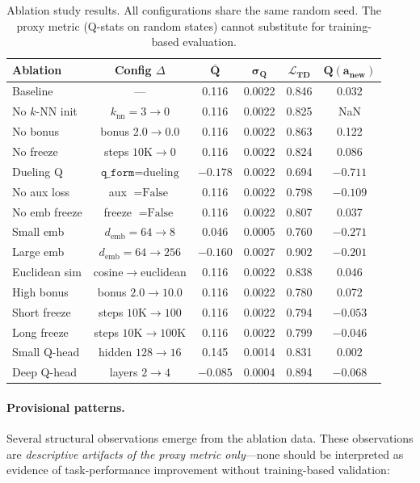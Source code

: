 \documentclass{article}
\begin{document}
\begin{table}[h]
  \centering
  \caption{Ablation study results. All configurations share the same random seed. The proxy metric (Q-stats on random states) cannot substitute for training-based evaluation.}
  \label{tab:ablations}
  \small
  \begin{tabular}{lccccc}
    \toprule
    \textbf{Ablation} & \textbf{Config $\Delta$} & $\mathbf{\bar{Q}}$ & $\mathbf{\sigma_Q}$ & $\mathbf{\mathcal{L}_\text{TD}}$ & $\mathbf{Q(a_\text{new})}$ \\
    \midrule
    Baseline & --- & 0.116 & 0.0022 & 0.846 & 0.032 \\
    No $k$-NN init & $k_\text{nn}=3 \to 0$ & 0.116 & 0.0022 & 0.825 & NaN \\
    No bonus & bonus $2.0 \to 0.0$ & 0.116 & 0.0022 & 0.863 & 0.122 \\
    No freeze & steps $10\text{K} \to 0$ & 0.116 & 0.0022 & 0.824 & 0.086 \\
    Dueling Q & $\texttt{q\_form}=\text{dueling}$ & $-0.178$ & 0.0022 & 0.694 & $-0.711$ \\
    No aux loss & aux $=\text{False}$ & 0.116 & 0.0022 & 0.798 & $-0.109$ \\
    No emb freeze & freeze $=\text{False}$ & 0.116 & 0.0022 & 0.807 & 0.037 \\
    Small emb & $d_\text{emb}=64\to 8$ & 0.046 & 0.0005 & 0.760 & $-0.271$ \\
    Large emb & $d_\text{emb}=64\to 256$ & $-0.160$ & 0.0027 & 0.902 & $-0.201$ \\
    Euclidean sim & cosine$\to$euclidean & 0.116 & 0.0022 & 0.838 & 0.046 \\
    High bonus & bonus $2.0\to 10.0$ & 0.116 & 0.0022 & 0.780 & 0.072 \\
    Short freeze & steps $10\text{K}\to 100$ & 0.116 & 0.0022 & 0.794 & $-0.053$ \\
    Long freeze & steps $10\text{K}\to 100\text{K}$ & 0.116 & 0.0022 & 0.799 & $-0.046$ \\
    Small Q-head & hidden $128\to 16$ & 0.145 & 0.0014 & 0.831 & 0.002 \\
    Deep Q-head & layers $2\to 4$ & $-0.085$ & 0.0004 & 0.894 & $-0.068$ \\
    \bottomrule
  \end{tabular}
\end{table}

\paragraph{Provisional patterns.} Several structural observations emerge from the ablation data. These observations are \emph{descriptive artifacts of the proxy metric only}---none should be interpreted as evidence of task-performance improvement without training-based validation:
\end{document}
